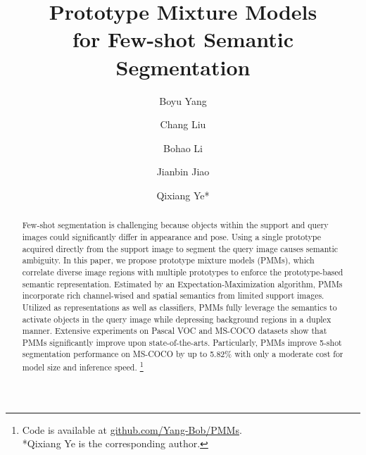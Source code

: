 \documentclass[runningheads]{llncs}
\begin{document}
\pagestyle{headings}
\mainmatter
\def\ECCVSubNumber{700}  \def\etal{\textit{et al.}}

\title{Prototype Mixture Models \\for Few-shot Semantic Segmentation} 

\begin{comment}
\titlerunning{ECCV-20 submission ID \ECCVSubNumber}
\authorrunning{ECCV-20 submission ID \ECCVSubNumber}
\author{Anonymous ECCV submission}
\institute{Paper ID \ECCVSubNumber}
\end{comment}


\author{Boyu Yang \and
Chang Liu \and
Bohao Li \and
Jianbin Jiao \and
Qixiang Ye*}
\maketitle

\begin{abstract}
Few-shot segmentation is challenging because objects within the support and query images could significantly differ in appearance and pose. Using a single prototype acquired directly from the support image to segment the query image causes semantic ambiguity. In this paper, we propose prototype mixture models (PMMs), which correlate diverse image regions with multiple prototypes to enforce the prototype-based semantic representation. Estimated by an Expectation-Maximization algorithm, PMMs incorporate rich channel-wised and spatial semantics from limited support images. Utilized as representations as well as classifiers, PMMs fully leverage the semantics to activate objects in the query image while depressing background regions in a duplex manner. Extensive experiments on Pascal VOC and MS-COCO datasets show that PMMs significantly improve upon state-of-the-arts. Particularly, PMMs improve 5-shot segmentation performance on MS-COCO by up to 5.82\% with only a moderate cost for model size and inference speed. 
\footnote{Code is available at \href{https://github.com/Yang-Bob/PMMs}{\color{magenta}github.com/Yang-Bob/PMMs}. \\ *Qixiang Ye is the corresponding author.}

\end{abstract}
\end{document}
